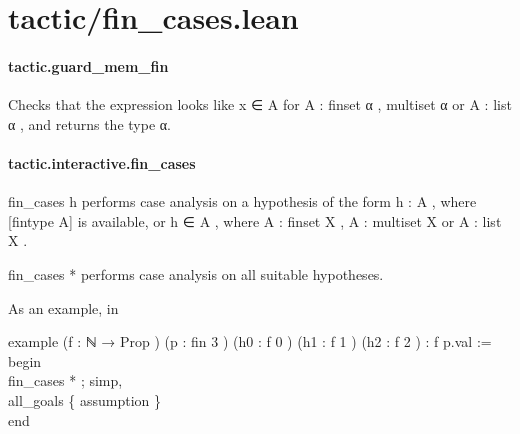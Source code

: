 \documentclass{article}
\begin{document}
\section{tactic/fin\_cases.lean}\paragraph{tactic.guard\_mem\_fin}
\par
Checks that the expression looks like 
\colorbox[RGB]{253,246,227}{{{{\color[RGB]{101, 123, 131} x ∈ A }}}} for 
\colorbox[RGB]{253,246,227}{{{{\color[RGB]{101, 123, 131} A : finset α }}}}, 
\colorbox[RGB]{253,246,227}{{{{\color[RGB]{101, 123, 131} multiset α }}}} or 
\colorbox[RGB]{253,246,227}{{{{\color[RGB]{101, 123, 131} A : list α }}}},
and returns the type α.
\paragraph{tactic.interactive.fin\_cases}
\par
\colorbox[RGB]{253,246,227}{{{{\color[RGB]{101, 123, 131} fin\_cases h }}}} performs case analysis on a hypothesis of the form
\colorbox[RGB]{253,246,227}{{{{\color[RGB]{101, 123, 131} h : A }}}}, where 
\colorbox[RGB]{253,246,227}{{{{\color[RGB]{101, 123, 131} {[}fintype A{]} }}}} is available, or
\colorbox[RGB]{253,246,227}{{{{\color[RGB]{101, 123, 131} h ∈ A }}}}, where 
\colorbox[RGB]{253,246,227}{{{{\color[RGB]{101, 123, 131} A : finset X }}}}, 
\colorbox[RGB]{253,246,227}{{{{\color[RGB]{101, 123, 131} A : multiset X }}}} or 
\colorbox[RGB]{253,246,227}{{{{\color[RGB]{101, 123, 131} A : list X }}}}.
\par
\colorbox[RGB]{253,246,227}{{{{\color[RGB]{101, 123, 131} fin\_cases  }}}{{{\color[RGB]{181, 137, 0} * }}}} performs case analysis on all suitable hypotheses.
\par
As an example, in
\\
\colorbox[RGB]{253,246,227}{\parbox{4.5in}{{{{\color[RGB]{133, 153, 0} example }}}{{{\color[RGB]{101, 123, 131}  (f : ℕ  }}}{{{\color[RGB]{133, 153, 0} → }}}{{{\color[RGB]{101, 123, 131}   }}}{{{\color[RGB]{38, 139, 210} Prop }}}{{{\color[RGB]{101, 123, 131} ) (p : fin  }}}{{{\color[RGB]{108, 113, 196} 3 }}}{{{\color[RGB]{101, 123, 131} ) (h0 : f  }}}{{{\color[RGB]{108, 113, 196} 0 }}}{{{\color[RGB]{101, 123, 131} ) (h1 : f  }}}{{{\color[RGB]{108, 113, 196} 1 }}}{{{\color[RGB]{101, 123, 131} ) (h2 : f  }}}{{{\color[RGB]{108, 113, 196} 2 }}}{{{\color[RGB]{101, 123, 131} ) : f p.val  }}}{{{\color[RGB]{181, 137, 0} := }}}{{{\color[RGB]{101, 123, 131} 
 }}}\\
{{{\color[RGB]{133, 153, 0} begin }}}{{{\color[RGB]{101, 123, 131} 
 }}}\\
{{{\color[RGB]{101, 123, 131}   fin\_cases  }}}{{{\color[RGB]{181, 137, 0} * }}}{{{\color[RGB]{101, 123, 131} ; simp,
 }}}\\
{{{\color[RGB]{101, 123, 131}   all\_goals \{ assumption \}
 }}}\\
{{{\color[RGB]{133, 153, 0} end }}}{{{\color[RGB]{101, 123, 131} 
 }}}\\

}}\par
\end{document}
